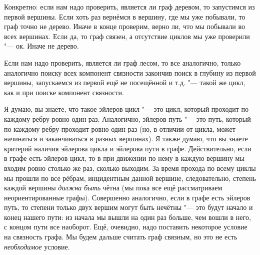Конкретно: если нам надо проверить, является ли граф деревом, то запустимся из первой вершины. Если 
хоть раз вернёмся в вершину, где мы уже побывали, то граф точно не дерево. Иначе в конце проверим, 
верно ли, что мы побывали во всех вершинах. Если да, то граф связен, а отсутствие циклов мы уже 
проверили "--- ок. Иначе не дерево.

Если нам надо проверить, является ли граф лесом, то все аналогично, только аналогично поиску всех 
компонент связности закончив поиск в глубину из первой вершины, запускаемся из первой ещё не 
посещённой и т.д. "--- такой же цикл, как и при поиске компонент связности.


Я думаю, вы знаете, что такое эйлеров цикл "--- это цикл, который проходит по каждому ребру ровно 
один раз. Аналогично, эйлеров путь "--- это путь, который по каждому ребру проходит ровно один раз 
(но, в отличии от цикла, может начинаться и заканчиваться в разных вершинах). Я также думаю, что вы 
знаете критерий наличия эйлерова цикла и эйлерова пути в графе. Действительно, если в графе есть 
эйлеров цикл, то в при движении по нему в каждую вершину мы входим ровно столько же раз, сколько 
выходим. За время прохода по всему циклы мы прошли по все рёбрам, инцидентным данной вершине, 
следовательно, степень каждой вершины \textit{должна быть} чётна (мы пока все ещё рассматриваем 
неориентированные графы). Совершенно аналогично, если в графе есть эйлеров путь, то степени только 
двух вершим могут быть нечётны "--- это будут начало и конец нашего пути: из начала мы вышли на 
один раз больше, чем вошли в него, с концом пути все наоборот. Ещё, очевидно, надо поставить некоторое 
условие на связность графа. Мы будем дальше считать граф связным, но это не есть 
\textit{необходимое} условие.

